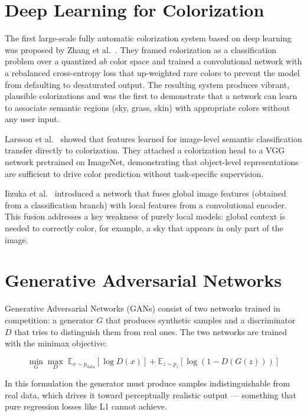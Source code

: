 \documentclass[12pt, a4paper, oneside]{report}
\begin{document}
\section{Deep Learning for Colorization}

The first large-scale fully automatic colorization system based on deep learning was
proposed by Zhang et al.\ \cite{zhang2016colorful}. They framed colorization as a
classification problem over a quantized $ab$ color space and trained a convolutional
network with a rebalanced cross-entropy loss that up-weighted rare colors to prevent
the model from defaulting to desaturated output. The resulting system produces
vibrant, plausible colorizations and was the first to demonstrate that a network can
learn to associate semantic regions (sky, grass, skin) with appropriate colors without
any user input.

Larsson et al.\ \cite{larsson2016learning} showed that features learned for
image-level semantic classification transfer directly to colorization. They attached
a colorization head to a VGG network pretrained on ImageNet, demonstrating that
object-level representations are sufficient to drive color prediction without
task-specific supervision.

Iizuka et al.\ \cite{iizuka2016let} introduced a network that fuses global image
features (obtained from a classification branch) with local features from a
convolutional encoder. This fusion addresses a key weakness of purely local models:
global context is needed to correctly color, for example, a sky that appears in only
part of the image.

\section{Generative Adversarial Networks}

Generative Adversarial Networks (GANs) \cite{goodfellow2014generative} consist of
two networks trained in competition: a generator $G$ that produces synthetic samples
and a discriminator $D$ that tries to distinguish them from real ones. The two
networks are trained with the minimax objective:

\begin{equation}
    \min_G \max_D \; \mathbb{E}_{x \sim p_{\text{data}}}[\log D(x)]
    + \mathbb{E}_{z \sim p_z}[\log(1 - D(G(z)))]
\end{equation}

In this formulation the generator must produce samples indistinguishable from real
data, which drives it toward perceptually realistic output — something that pure
regression losses like L1 cannot achieve.
\end{document}
